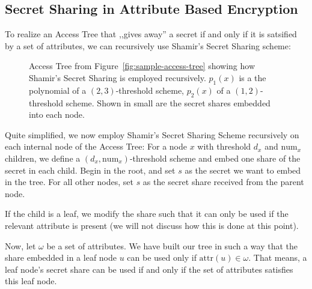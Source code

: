\subsection{Secret Sharing in Attribute Based Encryption}
To realize an Access Tree that ,,gives away'' a secret if and only if it is satsified by a set of attributes, we can recursively use Shamir's Secret Sharing scheme:

\begin{figure}
    \centering
    \caption[Shamir's Secret sharing in Access Trees]{
        Access Tree from Figure~\ref{fig:sample-access-tree} showing how Shamir's Secret Sharing is employed recursively.
        $p_1(x)$ is a the polynomial of a $(2,3)$-threshold scheme, $p_2(x)$ of a $(1,2)$-threshold scheme.
        Shown in small are the secret shares embedded into each node.
    }
    \label{fig:sample-access-tree-shamir}
\end{figure}

Quite simplified, we now employ Shamir's Secret Sharing Scheme recursively on each internal node of the Access Tree:
For a node $x$ with threshold $d_x$ and $\text{num}_x$ children, we define a $(d_x, \text{num}_x)$-threshold scheme and embed one share of the secret in each child.
Begin in the root, and set $s$ as the secret we want to embed in the tree. For all other nodes, set $s$ as the secret share received from the parent node.

If the child is a leaf, we modify the share such that it can only be used if the relevant attribute is present (we will not discuss how this is done at this point).

Now, let $\omega$ be a set of attributes.
We have built our tree in such a way that the share embedded in a leaf node $u$ can be used only if $\text{attr}(u) \in \omega$.
That means, a leaf node's secret share can be used if and only if the set of attributes satisfies this leaf node.

